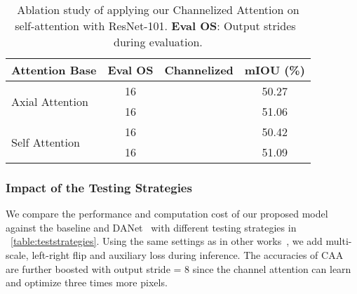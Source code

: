 \documentclass[letterpaper]{article} \usepackage{aaai22}  \usepackage{times}  \usepackage{helvet}  \usepackage{courier}  \usepackage[hyphens]{url}  \usepackage{graphicx} \urlstyle{rm} \def\UrlFont{\rm}  \usepackage{natbib}  \usepackage{caption} \DeclareCaptionStyle{ruled}{labelfont=normalfont,labelsep=colon,strut=off} \frenchspacing  \setlength{\pdfpagewidth}{8.5in}  \setlength{\pdfpageheight}{11in}  \usepackage{algorithm}
\begin{document}
\begin{table}[t]
	\centering
	\small
	\begin{tabular}{l|c|c|c} 
		\toprule
		Attention Base                    & Eval OS & Channelized     & mIOU (\%)   \\
		\midrule[0.5pt]
		\midrule[0.5pt]
		\multirow{2}{*}{Axial Attention  }& 16       &             & 50.27  \\
		& 16  	 & \checkmark  & 51.06  \\
		\midrule
		\multirow{2}{*}{  Self Attention} & 16  	 &             & 50.42  \\
		& 16  	 & \checkmark  & 51.09  \\
		\bottomrule[0.5pt]
	\end{tabular}
	\caption{Ablation study of applying our Channelized Attention on self-attention with ResNet-101. \textbf{Eval OS}: Output strides~\cite{cDeepLabV3Plus} during evaluation.}
	\label{tabCSA}
\end{table}

\subsubsection{Impact of the Testing Strategies} 
We compare the performance and computation cost of our proposed model against the baseline and DANet~\cite{cDualAttention} with different testing strategies in \tablename{~\ref{table:teststrategies}}.
Using the same settings as in other works~\cite{cDualAttention}, we add multi-scale, left-right flip and auxiliary loss during inference. 
The accuracies of CAA are further boosted with output stride = 8 since the channel attention can learn and optimize three times more pixels.
\end{document}
